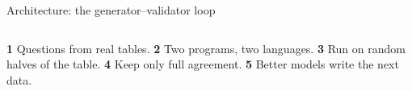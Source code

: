 \documentclass[11pt,aspectratio=169]{beamer}
\begin{document}
\begin{frame}{Architecture: the generator--validator loop}
\begin{center}
\end{center}
\vspace{0.1cm}
{\scriptsize
\begin{columns}[T]
\textbf{\color{tsred}1} Questions from real tables.
\textbf{\color{tsred}2} Two programs, two languages.
\textbf{\color{tsred}3} Run on random halves of the table.
\textbf{\color{tsred}4} Keep only full agreement.
\textbf{\color{tsred}5} Better models write the next data.
\end{columns}}
\end{frame}
\end{document}
